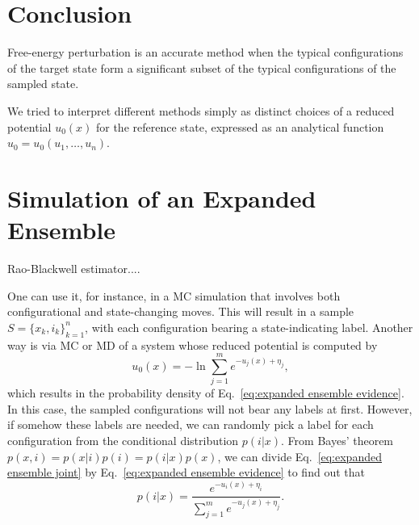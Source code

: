 \documentclass[aip,jcp,reprint,amsmath,amssymb]{revtex4-1}
\begin{document}
\section{Conclusion}

Free-energy perturbation is an accurate method when the typical configurations of the target state form a significant subset of the typical configurations of the sampled state.

We tried to interpret different methods simply as distinct choices of a reduced potential $u_0(x)$ for the reference state, expressed as an analytical function $u_0 = u_0(u_1,\dots,u_n)$.

\appendix

\section{Simulation of an Expanded Ensemble}
\label{sec:expanded ensemble simulation}

Rao-Blackwell estimator\cite{Ding_2017}....

One can use it, for instance, in a MC simulation that involves both configurational and state-changing moves.\cite{Lyubartsev_1992} This will result in a sample $S = \{x_k,i_k\}_{k=1}^n$, with each configuration bearing a state-indicating label. Another way is via MC or MD of a system whose reduced potential is computed by
\begin{equation}
u_0(x) = - \ln \sum_{j=1}^m e^{-u_j(x) + \eta_j},
\end{equation}
which results in the probability density of Eq.~\eqref{eq:expanded ensemble evidence}. In this case, the sampled configurations will not bear any labels at first. However, if somehow these labels are needed, we can randomly pick a label for each configuration from the conditional distribution $p(i|x)$.\cite{Nymeyer_2010} From Bayes' theorem $p(x,i) = p(x|i) p(i) = p(i|x) p(x)$, we can divide Eq.~\eqref{eq:expanded ensemble joint} by Eq.~\eqref{eq:expanded ensemble evidence} to find out that
\begin{equation}
p(i|x) = \frac{e^{-u_i(x) + \eta_i}}{\sum_{j=1}^m e^{-u_j(x) + \eta_j}}.
\end{equation}
\end{document}
